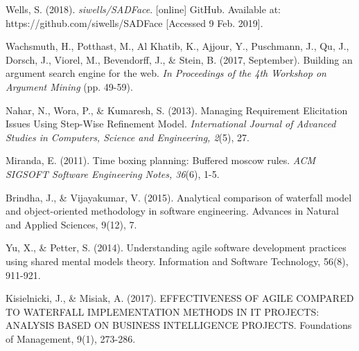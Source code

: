 \documentclass[12pt,a4paper]{article}
\begin{document}
\begin{thebibliography}{9}
  Wells, S. (2018). \textit{siwells/SADFace}. [online] GitHub. Available at: https://github.com/siwells/SADFace [Accessed 9 Feb. 2019].
  
  Wachsmuth, H., Potthast, M., Al Khatib, K., Ajjour, Y., Puschmann, J., Qu, J., Dorsch, J., Viorel, M., Bevendorff, J., \& Stein, B. (2017, September). Building an argument search engine for the web. \textit{In Proceedings of the 4th Workshop on Argument Mining} (pp. 49-59).
 
  Nahar, N., Wora, P., \& Kumaresh, S. (2013). Managing Requirement Elicitation Issues Using Step-Wise Refinement Model. \textit{International Journal of Advanced Studies in Computers, Science and Engineering, 2}(5), 27.

  Miranda, E. (2011). Time boxing planning: Buffered moscow rules. \textit{ACM SIGSOFT Software Engineering Notes, 36}(6), 1-5.
  
  Brindha, J., \& Vijayakumar, V. (2015). Analytical comparison of waterfall model and object-oriented methodology in software engineering. Advances in Natural and Applied Sciences, 9(12), 7.
  
  Yu, X., \& Petter, S. (2014). Understanding agile software development practices using shared mental models theory. Information and Software Technology, 56(8), 911-921.
  
  Kisielnicki, J., \& Misiak, A. (2017). EFFECTIVENESS OF AGILE COMPARED TO WATERFALL IMPLEMENTATION METHODS IN IT PROJECTS: ANALYSIS BASED ON BUSINESS INTELLIGENCE PROJECTS. Foundations of Management, 9(1), 273-286.
\end{thebibliography}
\end{document}
